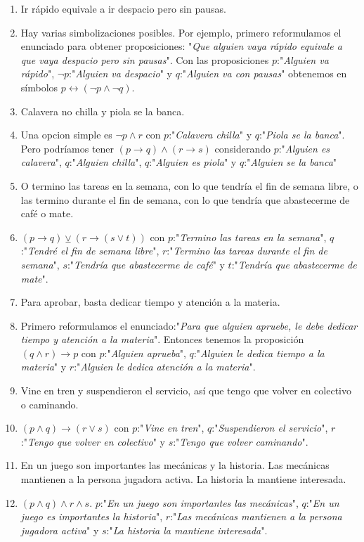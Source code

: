 \documentclass[a4paper]{article}
\newcommand{\Item}{\item[\stepcounter{enumii}$\blacktriangleright$\textbf{(\alph{enumii})}]} %
\newcommand{\answer}{\item[**]}
\newcommand{\then}{\to}
\newcommand{\eq}{\leftrightarrow}
\newcommand{\xor}{\veebar}
\begin{document}
\begin{enumerate}
\begin{multicols}{2}
\begin{enumerate} [label=(\alph*)]
		\item Ir rápido equivale a ir despacio pero sin pausas. 
		\answer Hay varias simbolizaciones posibles. Por ejemplo, primero reformulamos el enunciado para obtener proposiciones: "\textit{Que alguien vaya rápido equivale a que vaya despacio pero sin pausas}". Con las proposiciones $p$:"\textit{Alguien va rápido}", $\neg p$:"\textit{Alguien va despacio}" y $q$:"\textit{Alguien va con pausas}" obtenemos en símbolos $p \eq (\neg p \land \neg q)$.

		\item Calavera no chilla y piola se la banca.
		\answer Una opcion simple es $\neg p  \land  r$ con $p$:"\textit{Calavera chilla}" y $q$:"\textit{Piola se la banca}". Pero podríamos tener $( p\then q )  \land  ( r\then s )$ considerando $p$:"\textit{Alguien es calavera}", $q$:"\textit{Alguien chilla}", $q$:"\textit{Alguien es piola}" y $q$:"\textit{Alguien se la banca}"

		\Item O termino las tareas en la semana, con lo que tendría el fin de semana libre, o las termino durante el fin de semana, con lo que tendría que abastecerme de café o mate.  
		\answer $( p \then  q ) \xor  ( r \then  ( s \lor  t) )$ con $p$:"\textit{Termino las tareas en la semana}", $q$:"\textit{Tendré el fin de semana libre}", $r$:"\textit{Termino las tareas durante el fin de semana}", $s$:"\textit{Tendría que abastecerme de café}" y $t$:"\textit{Tendría que abastecerme de mate}".

		\item Para aprobar, basta dedicar tiempo y atención a la materia.  
		\answer Primero reformulamos el enunciado:"\textit{Para que alguien apruebe, le debe dedicar tiempo y atención a la materia}". Entonces tenemos la proposición $( q  \land  r ) \then  p$ con $p$:"\textit{Alguien aprueba}", $q$:"\textit{Alguien le dedica tiempo a la materia}" y $r$:"\textit{Alguien le dedica atención a la materia}".

		\Item Vine en tren y suspendieron el servicio, así que tengo que volver en colectivo o caminando.
		\answer $( p  \land  q ) \then  ( r \lor  s )$ con $p$:"\textit{Vine en tren}", $q$:"\textit{Suspendieron el servicio}", $r$:"\textit{Tengo que volver en colectivo}" y $s$:"\textit{Tengo que volver caminando}".

		\item En un juego son importantes las mecánicas y la historia. Las mecánicas mantienen a la persona jugadora activa. La historia la mantiene interesada. 
		\answer $( p  \land  q )  \land  r  \land  s $. $p$:"\textit{En un juego son importantes las mecánicas}", $q$:"\textit{En un juego es importantes la historia}", $r$:"\textit{Las mecánicas mantienen a la persona jugadora activa}" y $s$:"\textit{La historia la mantiene interesada}".


\end{enumerate}
\end{multicols}
\end{enumerate}
\end{document}
